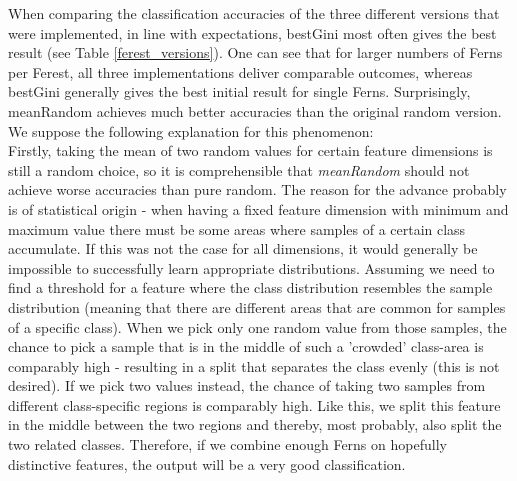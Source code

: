\documentclass[twocolumn]{article}
\begin{document}
When comparing the classification accuracies of the three different versions that were implemented, in line with expectations, bestGini most often gives the best result (see Table \ref{ferest_versions}). One can see that for larger numbers of Ferns per Ferest, all three implementations deliver comparable outcomes, whereas bestGini generally gives the best initial result for single Ferns. Surprisingly, meanRandom achieves much better accuracies than the original random version. We suppose the following explanation for this phenomenon:\\
Firstly, taking the mean of two random values for certain feature dimensions is still a random choice, so it is comprehensible that \textit{meanRandom} should not achieve worse accuracies than pure random. The reason for the advance probably is of statistical origin - when having a fixed feature dimension with minimum and maximum value there must be some areas where samples of a certain class accumulate. If this was not the case for all dimensions, it would generally be impossible to successfully learn appropriate distributions. Assuming we need to find a threshold for a feature where the class distribution resembles the sample distribution (meaning that there are different areas that are common for samples of a specific class). When we pick only one random value from those samples, the chance to pick a sample that is in the middle of such a 'crowded' class-area is comparably high - resulting in a split that separates the class evenly (this is not desired). If we pick two values instead, the chance of taking two samples from different class-specific regions is comparably high. Like this, we split this feature in the middle between the two regions and thereby, most probably, also split the two related classes. Therefore, if we combine enough Ferns on hopefully distinctive features, the output will be a very good classification.
\end{document}
